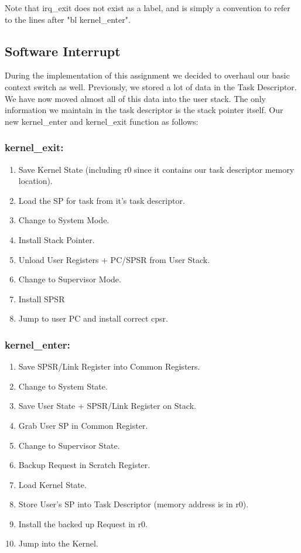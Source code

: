 \documentclass{article}
\begin{document}
Note that irq\_exit does not exist as a label, and is simply a convention to refer to the lines after "bl kernel\_enter".

\subsection{Software Interrupt}

During the implementation of this assignment we decided to overhaul our basic context switch as well. Previously, we stored a lot of data in the Task Descriptor. We have now moved almost all of this data into the user stack. The only information we maintain in the task descriptor is the stack pointer itself. Our new kernel\_enter and kernel\_exit function as follows:

\subsubsection{kernel\_exit:}
\begin{enumerate}
    \item Save Kernel State (including r0 since it contains our task descriptor memory location).
    \item Load the SP for task from it's task descriptor.
    \item Change to System Mode. 
    \item Install Stack Pointer.
    \item Unload User Registers + PC/SPSR from User Stack.
    \item Change to Supervisor Mode.
    \item Install SPSR
    \item Jump to user PC and install correct cpsr.
\end{enumerate}

\subsubsection{kernel\_enter:}
\begin{enumerate}
   \item Save SPSR/Link Register into Common Registers.
   \item Change to System State.
   \item Save User State + SPSR/Link Register on Stack.
   \item Grab User SP in Common Register.
   \item Change to Supervisor State.
   \item Backup Request in Scratch Register.
   \item Load Kernel State.
   \item Store User's SP into Task Descriptor (memory address is in r0).
   \item Install the backed up Request in r0.
   \item Jump into the Kernel.
\end{enumerate}
\end{document}
